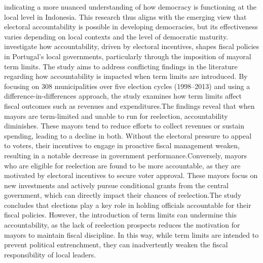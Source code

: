 indicating a more nuanced understanding of how democracy is functioning at the local level in Indonesia. This research thus aligns with the emerging view that electoral accountability is possible in developing democracies, but its effectiveness varies depending on local contexts and the level of democratic maturity.\\
    investigate how accountability, driven by electoral incentives, shapes fiscal policies in Portugal’s local governments, particularly through the imposition of mayoral term limits. The study aims to address conflicting findings in the literature regarding how accountability is impacted when term limits are introduced. By focusing on 308 municipalities over five election cycles (1998–2013) and using a difference-in-differences approach, the study examines how term limits affect fiscal outcomes such as revenues and expenditures.The findings reveal that when mayors are term-limited and unable to run for reelection, accountability diminishes. These mayors tend to reduce efforts to collect revenues or sustain spending, leading to a decline in both. Without the electoral pressure to appeal to voters, their incentives to engage in proactive fiscal management weaken, resulting in a notable decrease in government performance.Conversely, mayors who are eligible for reelection are found to be more accountable, as they are motivated by electoral incentives to secure voter approval. These mayors focus on new investments and actively pursue conditional grants from the central government, which can directly impact their chances of reelection.The study concludes that elections play a key role in holding officials accountable for their fiscal policies. However, the introduction of term limits can undermine this accountability, as the lack of reelection prospects reduces the motivation for mayors to maintain fiscal discipline. In this way, while term limits are intended to prevent political entrenchment, they can inadvertently weaken the fiscal responsibility of local leaders.\\
